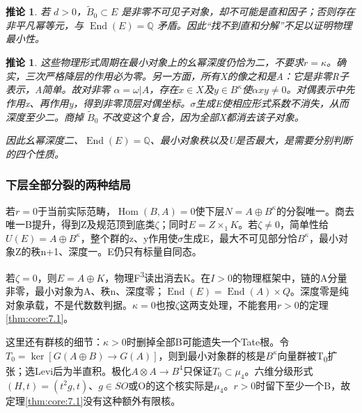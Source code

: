 \documentclass[11pt,a4paper,oneside]{ctexart}
\theoremstyle{cnplain}
\newtheorem{corollary}[theorem]{推论}
\theoremstyle{definition}
\theoremstyle{remark}
\numberwithin{equation}{section}
\begin{document}
\begin{corollary}

\label{thm:core:7.2} 若 \(d>0\)，\(\widetilde B_0\subset E\) 是非零不可见子对象，却不可能是直和因子；否则存在非平凡幂等元，与 \(\operatorname{End}(E)=\mathbb Q\) 矛盾。因此``找不到直和分解''不足以证明物理最小性。

\end{corollary}

\begin{corollary}

\label{thm:core:7.3} 这些物理形式周期在最小对象上的幺幂深度仍恰为二，不要求\(r=\kappa \)。确实，三次严格降层的作用必为零。另一方面，所有X的像之和是A：它是非零R子表示，A简单。故对非零 \(\alpha=\omega|A\)，存在\(x\in X\)及\(y\in B^\kappa \)使\(\alpha xy\ne 0\)。对偶表示中先作用x、再作用y，得到非零顶层对偶坐标。\(\sigma \)生成E使相应形式系数不消失，从而深度至少二。商掉 \(\widetilde B_0\) 不改变这个复合，因为全部X都消去该子对象。

因此幺幂深度二、\(\operatorname{End}(E)=\mathbb Q\)、最小对象秩以及U是否最大，是需要分别判断的四个性质。

\end{corollary}

\subsubsection{下层全部分裂的两种结局}\label{sec:core:7.4}

若\(r=0\)于当前实际范畴，\(\operatorname{Hom}(B,A)=0\)使下层\(N=A\oplus B^\kappa \)的分裂唯一。商去唯一B提升，得到Z及规范顶到底类\(\zeta \)；同时\(E=Z\times _{1}K\)。若\(\zeta \ne 0\)，简单性给\(U(E)=A\oplus B^\kappa \)，整个群的z、y作用使\(\sigma \)生成E，最大不可见部分恰\(B^\kappa \)，最小对象Z的秩n+1、深度一。E仍只有标量自同态。

若\(\zeta =0\)，则\(E=A\oplus K\)，物理F\textsuperscript{3}读出消去K。在\(I>0\)的物理框架中，链的A分量非零，最小对象为A、秩n、深度零；\(\operatorname{End}(E)=\operatorname{End}(A)\times Q\)。深度零是纯对象承载，不是代数数判据。\(\kappa =0\)也按\(\zeta \)这两支处理，不能套用\(r>0\)的定理\ref{thm:core:7.1}。

这里还有群核的细节：\(\kappa >0\)时删掉全部B可能遗失一个Tate根。令\(T_{0}=\operatorname{ker}[G(A\oplus B)\to G(A)]\)，则到最小对象群的核是\(B^\kappa \)向量群被T\textsubscript{0}扩张；选Levi后为半直积。极化\(A\otimes A\to B^{4}\)只保证\(T_{0}\subset \mu _{4}\)。六维分级形式\((H,t)=(t^{2}g,t)\)、\(g\in SO\)或O的这个核实际是\(\mu _{4}\)。\(r>0\)时留下至少一个B，故定理\ref{thm:core:7.1}没有这种额外有限核。
\end{document}
